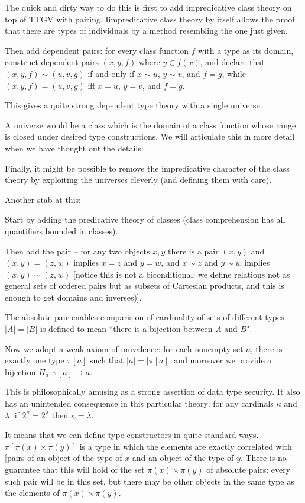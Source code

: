 \documentclass[12pt]{article}
\begin{document}
The quick and dirty way to do this is first to add impredicative class theory on top of TTGV with pairing.   Iimpredicative class theory by itself allows the proof that there are types of individuals by a method resembling the one just given.

Then add dependent pairs:  for every class function $f$ with a type as its domain, construct dependent pairs
$(x,y,f)$ where $y \in f(x)$, and declare that $(x,y,f) \sim (u,v,g)$ if and only if $x \sim u$, $y \sim v$, and $f=g$, while
$(x,y,f)=(u,v,g)$ iff $x=u$, $y=v$, and $f=g$.

This gives a quite strong dependent type theory with a single universe.

A universe would be a class which is the domain of a class function whose range is closed under desired type constructions.  We will articulate this in more detail when we have thought out the details.

Finally, it might be possible to remove the impredicative character of the class theory by exploiting the universes cleverly
(and defining them with care).

Another stab at this:

Start by adding the predicative theory of classes (class comprehension has all quantifiers bounded in classes).

Then add the pair -- for any two objects $x,y$ there is a pair $(x,y)$ and $(x,y)=(z,w)$ implies $x=z$ and $y=w$,
and $x \sim z$ and $y \sim w$ implies $(x,y) \sim (z,w)$ [notice this is not a biconditional:  we define relations not
as general sets of ordered pairs but as subsets of Cartesian products, and this is enough to get domains and inverses)].

The absolute pair enables comparision of cardinality of sets of different types.  $|A|=|B|$ is defined to mean
``there is a bijection between $A$ and $B$".

Now we adopt a weak axiom of univalence:  for each nonempty set $a$, there is exactly one type $\pi[a]$ such
that $|a|=|\pi[a]|$ and moreover we provide a bijection $\Pi_a:\pi[a] \rightarrow a$.

This is philosophically amusing as a strong assertion of data type security.  It also has an unintended consequence
in this particular theory:  for any cardinals $\kappa$ and $\lambda$, if $2^\kappa = 2^\lambda$ then $\kappa=\lambda$.

It means that we can define type constructors in quite standard ways.  $\pi[\pi(x) \times \pi(y)]$ is a type in which the elements are exactly correlated with [pairs of an object of the type of $x$ and an object of the type of $y$.  There is no guarantee that this will hold of the set $\pi(x) \times \pi(y)$ of absolute pairs:  every such pair will be in this set, but there may be other objects in the same type as the elements of $\pi(x) \times \pi(y)$.
\end{document}
